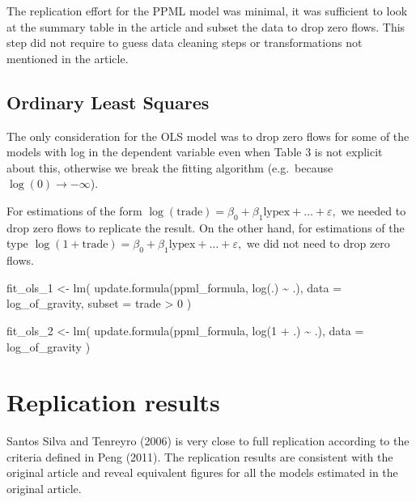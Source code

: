 \documentclass[letterpaper,twoside,12pt]{article}
\newenvironment{Shaded}{\begin{snugshade}}{\end{snugshade}}
\newcommand{\AttributeTok}[1]{\textcolor[rgb]{0.77,0.63,0.00}{#1}}
\newcommand{\DecValTok}[1]{\textcolor[rgb]{0.00,0.00,0.81}{#1}}
\newcommand{\FunctionTok}[1]{\textcolor[rgb]{0.00,0.00,0.00}{#1}}
\newcommand{\NormalTok}[1]{#1}
\newcommand{\OtherTok}[1]{\textcolor[rgb]{0.56,0.35,0.01}{#1}}
\newcommand{\SpecialCharTok}[1]{\textcolor[rgb]{0.00,0.00,0.00}{#1}}
\begin{document}
The replication effort for the PPML model was minimal, it was sufficient
to look at the summary table in the article and subset the data to drop
zero flows. This step did not require to guess data cleaning steps or
transformations not mentioned in the article.

\subsection{Ordinary Least Squares}\label{ordinary-least-squares}

The only consideration for the OLS model was to drop zero flows for some
of the models with log in the dependent variable even when Table 3 is
not explicit about this, otherwise we break the fitting algorithm
(e.g.~because \(\log(0) \to -\infty\)).

For estimations of the form
\(\log(\text{trade}) = \beta_0 + \beta_1 \text{lypex} + \dots + \varepsilon,\)
we needed to drop zero flows to replicate the result. On the other hand,
for estimations of the type
\(\log(1 + \text{trade}) = \beta_0 + \beta_1 \text{lypex} + \dots + \varepsilon,\)
we did not need to drop zero flows.

\begin{Shaded}
\begin{Highlighting}[]
\NormalTok{fit\_ols\_1 }\OtherTok{\textless{}{-}} \FunctionTok{lm}\NormalTok{(}
  \FunctionTok{update.formula}\NormalTok{(ppml\_formula, }\FunctionTok{log}\NormalTok{(.) }\SpecialCharTok{\textasciitilde{}}\NormalTok{ .),}
  \AttributeTok{data =}\NormalTok{ log\_of\_gravity,}
  \AttributeTok{subset =}\NormalTok{ trade }\SpecialCharTok{\textgreater{}} \DecValTok{0}
\NormalTok{)}

\NormalTok{fit\_ols\_2 }\OtherTok{\textless{}{-}} \FunctionTok{lm}\NormalTok{(}
  \FunctionTok{update.formula}\NormalTok{(ppml\_formula, }\FunctionTok{log}\NormalTok{(}\DecValTok{1} \SpecialCharTok{+}\NormalTok{ .) }\SpecialCharTok{\textasciitilde{}}\NormalTok{ .),}
  \AttributeTok{data =}\NormalTok{ log\_of\_gravity}
\NormalTok{)}
\end{Highlighting}
\end{Shaded}

\section{Replication results}\label{replication-results}

Santos Silva and Tenreyro (2006) is very close to full replication
according to the criteria defined in Peng (2011). The replication
results are consistent with the original article and reveal equivalent
figures for all the models estimated in the original article.
\end{document}
